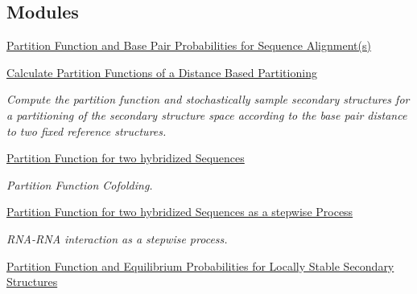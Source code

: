 \subsection*{Modules}
\begin{DoxyCompactItemize}
\item 
\hyperlink{group__consensus__pf__fold}{Partition Function and Base Pair Probabilities for Sequence Alignment(s)}
\item 
\hyperlink{group__kl__neighborhood__pf}{Calculate Partition Functions of a Distance Based Partitioning}
\begin{DoxyCompactList}\small\item\em Compute the partition function and stochastically sample secondary structures for a partitioning of the secondary structure space according to the base pair distance to two fixed reference structures. \end{DoxyCompactList}\item 
\hyperlink{group__pf__cofold}{Partition Function for two hybridized Sequences}
\begin{DoxyCompactList}\small\item\em Partition Function Cofolding. \end{DoxyCompactList}\item 
\hyperlink{group__up__cofold}{Partition Function for two hybridized Sequences as a stepwise Process}
\begin{DoxyCompactList}\small\item\em R\+N\+A-\/\+R\+NA interaction as a stepwise process. \end{DoxyCompactList}\item 
\hyperlink{group__local__pf__fold}{Partition Function and Equilibrium Probabilities for Locally Stable Secondary Structures}
\end{DoxyCompactItemize}
